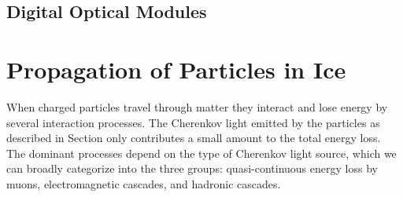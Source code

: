 \subsection{Digital Optical Modules}


\section{Propagation of Particles in Ice}

When charged particles travel through matter they interact and lose energy by several interaction processes.
The Cherenkov light emitted by the particles as described in Section  only contributes a small amount to the total energy loss.
The dominant processes depend on the type of Cherenkov light source, which we can broadly categorize into the three groups: quasi-continuous energy loss by muons, electromagnetic cascades, and hadronic cascades.

